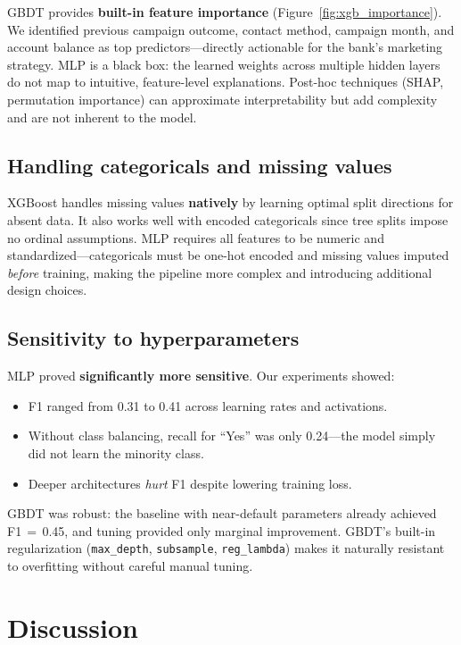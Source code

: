 \documentclass[11pt, a4paper]{article}
\begin{document}
GBDT provides \textbf{built-in feature importance} (Figure~\ref{fig:xgb_importance}).
We identified previous campaign outcome, contact method, campaign month, and
account balance as top predictors---directly actionable for the bank's marketing
strategy. MLP is a black box: the learned weights across multiple hidden layers
do not map to intuitive, feature-level explanations. Post-hoc techniques (SHAP,
permutation importance) can approximate interpretability but add complexity and
are not inherent to the model.

\subsection{Handling categoricals and missing values}

XGBoost handles missing values \textbf{natively} by learning optimal split
directions for absent data. It also works well with encoded categoricals since
tree splits impose no ordinal assumptions. MLP requires all features to be
numeric and standardized---categoricals must be one-hot encoded and missing
values imputed \emph{before} training, making the pipeline more complex and
introducing additional design choices.

\subsection{Sensitivity to hyperparameters}

MLP proved \textbf{significantly more sensitive}. Our experiments showed:
\begin{itemize}[nosep]
    \item F1 ranged from 0.31 to 0.41 across learning rates and activations.
    \item Without class balancing, recall for ``Yes'' was only 0.24---the model
          simply did not learn the minority class.
    \item Deeper architectures \emph{hurt} F1 despite lowering training loss.
\end{itemize}
GBDT was robust: the baseline with near-default parameters already achieved
F1\,$=$\,0.45, and tuning provided only marginal improvement. GBDT's built-in
regularization (\texttt{max\_depth}, \texttt{subsample}, \texttt{reg\_lambda})
makes it naturally resistant to overfitting without careful manual tuning.

\section{Discussion}
\end{document}
